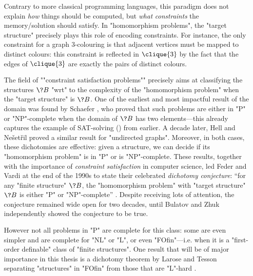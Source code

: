 Contrary to more classical programming languages, this paradigm does not explain \emph{how} things
should be computed, but \emph{what constraints} the memory/solution should satisfy.
In "homomorphism problems", the "target structure" precisely plays this role of
encoding constraints. For instance, the only constraint for a graph $3$-colouring is that
adjacent vertices must be mapped to distinct colours: this constraint is
reflected in $\clique{3}$ by the fact that the edges of $\clique{3}$ are exactly the pairs
of distinct colours.

The field of \AP""constraint satisfaction problems"" precisely aims at classifying the
structures $\?B$ "wrt" to the complexity of the "homomorphism problem" when the
"target structure" is $\?B$. One of the earliest and most impactful result
of the domain was found by Schaefer \cite{Schaefer1978ComplexitySatisfiability},
who proved that such problems are either in "P" or "NP"-complete when the domain of $\?B$
has two elements---this already captures the example of SAT-solving () from earlier.
A decade later, Hell and Ne\v{s}et\v{r}il \cite{HellNesetril1990ComplexityColoring}
proved a similar result for "undirected graphs".
Moreover, in both cases, these dichotomies are effective: given a structure, we can decide if
its "homomorphism problem" is in "P" or is "NP"-complete.
These results, together with the importance of \emph{constraint satisfaction} in computer science,
led Feder and Vardi at the end of the 1990s
to state their celebrated \emph{dichotomy conjecture}: ``for any "finite structure" $\?B$,
the "homomorphism problem" with "target structure" $\?B$ is either "P"
or "NP"-complete'' \cite{FederVardi1998ComputationalStructure}.
Despite receiving lots of attention, the conjecture remained wide open for two decades, until
Bulatov \cite{Bulatov2017DichotomyCSPs} and Zhuk \cite{Zhuk2020CSPDichotomy} independently
showed the conjecture to be true.%

However not all problems in "P" are complete for this class: some are even simpler and are complete
for "NL" or "L", or even "FOfin"---i.e. when it is a "first-order definable" class of "finite structures".
One result that will be of major importance in this thesis is a dichotomy
theorem by Larose and Tesson separating "structures" in "FOfin" from those that are "L"-hard
\cite{LaroseTesson2009UniversalAlgebraCSP}.

